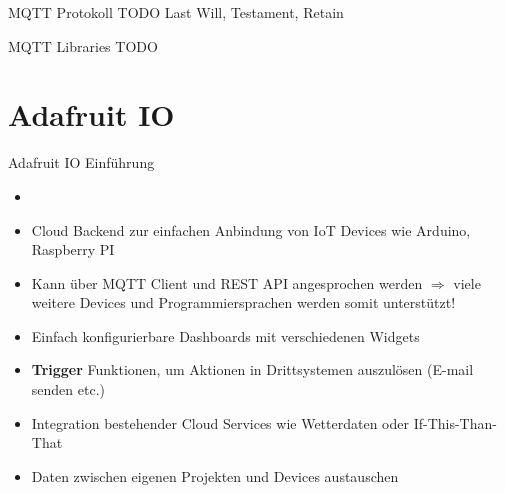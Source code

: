 \begin{frame}{MQTT Protokoll}
    TODO 
   Last Will, Testament, Retain
\end{frame}


\begin{frame}{MQTT Libraries}
    TODO
\end{frame}


\section{Adafruit IO}

\begin{frame}{Adafruit IO Einführung}
 \begin{itemize}
        \setlength{\itemindent}{1.4in}
        \item [\textbf{Adafruit IO Einführung}]
    \end{itemize}
    \begin{itemize}
        \item Cloud Backend zur einfachen Anbindung von IoT Devices wie Arduino, Raspberry PI
        \item Kann über MQTT Client und REST  API angesprochen werden  $\Rightarrow$ viele weitere Devices und Programmiersprachen werden somit unterstützt!
        \item Einfach konfigurierbare Dashboards mit verschiedenen Widgets
        \item \textbf{Trigger} Funktionen, um Aktionen in Drittsystemen auszulösen (E-mail senden etc.)
        \item Integration bestehender Cloud Services wie Wetterdaten oder If-This-Than-That
        \item Daten zwischen eigenen Projekten und Devices austauschen
    \end{itemize}    
\end{frame}


